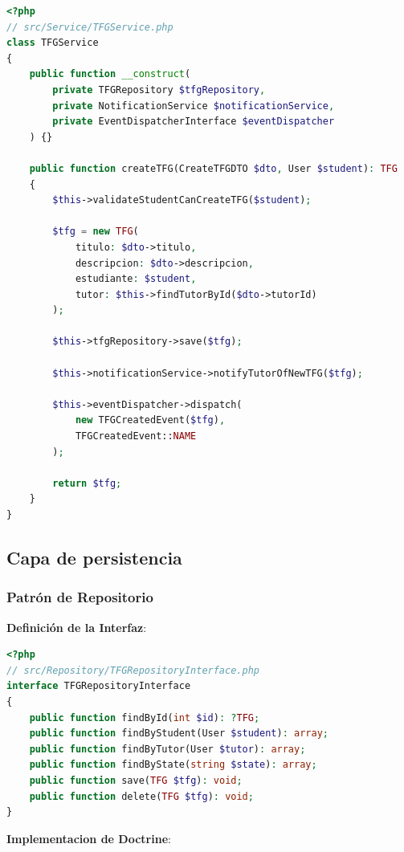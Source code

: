 \documentclass[12pt,a4paper,oneside]{report}
\begin{document}
\begin{lstlisting}[language=PHP]
<?php
// src/Service/TFGService.php
class TFGService
{
    public function __construct(
        private TFGRepository $tfgRepository,
        private NotificationService $notificationService,
        private EventDispatcherInterface $eventDispatcher
    ) {}
    
    public function createTFG(CreateTFGDTO $dto, User $student): TFG
    {
        $this->validateStudentCanCreateTFG($student);
        
        $tfg = new TFG(
            titulo: $dto->titulo,
            descripcion: $dto->descripcion,
            estudiante: $student,
            tutor: $this->findTutorById($dto->tutorId)
        );
        
        $this->tfgRepository->save($tfg);
        
        $this->notificationService->notifyTutorOfNewTFG($tfg);
        
        $this->eventDispatcher->dispatch(
            new TFGCreatedEvent($tfg),
            TFGCreatedEvent::NAME
        );
        
        return $tfg;
    }
}
\end{lstlisting}

\subsection{Capa de persistencia}\label{capa-de-persistencia}

\subsubsection{Patrón de Repositorio}\label{repository-pattern}

\textbf{Definición de la Interfaz}:

\begin{lstlisting}[language=PHP]
<?php
// src/Repository/TFGRepositoryInterface.php
interface TFGRepositoryInterface
{
    public function findById(int $id): ?TFG;
    public function findByStudent(User $student): array;
    public function findByTutor(User $tutor): array;
    public function findByState(string $state): array;
    public function save(TFG $tfg): void;
    public function delete(TFG $tfg): void;
}
\end{lstlisting}

\textbf{Implementacion de Doctrine}:
\end{document}
